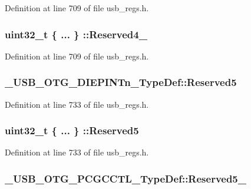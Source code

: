 Definition at line 709 of file usb\-\_\-regs.\-h.

\hypertarget{group___u_s_b___o_t_g___d_r_i_v_e_r_ga4d2137ca1ae007782afd567f3b541781}{
\subsubsection[{Reserved4\-\_\-7}]{\setlength{\rightskip}{0pt plus 5cm}uint32\-\_\-t \{ ... \} \-::Reserved4\-\_}}\label{group___u_s_b___o_t_g___d_r_i_v_e_r_ga4d2137ca1ae007782afd567f3b541781}


Definition at line 709 of file usb\-\_\-regs.\-h.

\hypertarget{group___u_s_b___o_t_g___d_r_i_v_e_r_ga57dcc37b8c90609671d6dfed1d8693c1}{
\subsubsection[{Reserved5}]{ \-\_\-\-U\-S\-B\-\_\-\-O\-T\-G\-\_\-\-D\-I\-E\-P\-I\-N\-Tn\-\_\-\-Type\-Def\-::\-Reserved5}}\label{group___u_s_b___o_t_g___d_r_i_v_e_r_ga57dcc37b8c90609671d6dfed1d8693c1}


Definition at line 733 of file usb\-\_\-regs.\-h.

\hypertarget{group___u_s_b___o_t_g___d_r_i_v_e_r_gad1cdcf72847fcee1a4bfe90963ca7a24}{
\subsubsection[{Reserved5}]{\setlength{\rightskip}{0pt plus 5cm}uint32\-\_\-t \{ ... \} \-::Reserved5}}\label{group___u_s_b___o_t_g___d_r_i_v_e_r_gad1cdcf72847fcee1a4bfe90963ca7a24}


Definition at line 733 of file usb\-\_\-regs.\-h.

\hypertarget{group___u_s_b___o_t_g___d_r_i_v_e_r_ga0a01d405634299e9f2312062b60786ba}{
\subsubsection[{Reserved5\-\_\-31}]{ \-\_\-\-U\-S\-B\-\_\-\-O\-T\-G\-\_\-\-P\-C\-G\-C\-C\-T\-L\-\_\-\-Type\-Def\-::\-Reserved5\-\_}}\label{group___u_s_b___o_t_g___d_r_i_v_e_r_ga0a01d405634299e9f2312062b60786ba}


